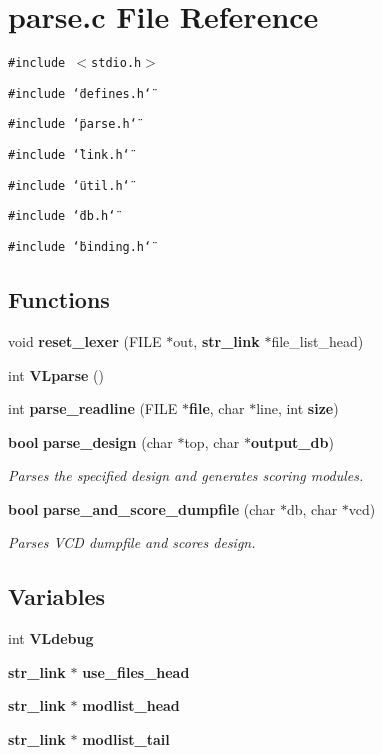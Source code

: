 \section{parse.c File Reference}
\label{parse_8c}
{\tt \#include $<$stdio.h$>$}\par
{\tt \#include \char`\"{}defines.h\char`\"{}}\par
{\tt \#include \char`\"{}parse.h\char`\"{}}\par
{\tt \#include \char`\"{}link.h\char`\"{}}\par
{\tt \#include \char`\"{}util.h\char`\"{}}\par
{\tt \#include \char`\"{}db.h\char`\"{}}\par
{\tt \#include \char`\"{}binding.h\char`\"{}}\par
\subsection*{Functions}
\begin{CompactItemize}
\item 
void {\bf reset\_\-lexer} (FILE $\ast$out, {\bf str\_\-link} $\ast$file\_\-list\_\-head)
\item 
int {\bf VLparse} ()
\item 
int {\bf parse\_\-readline} (FILE $\ast${\bf file}, char $\ast$line, int {\bf size})
\item 
{\bf bool} {\bf parse\_\-design} (char $\ast$top, char $\ast${\bf output\_\-db})
\begin{CompactList}\small\item\em Parses the specified design and generates scoring modules.\item\end{CompactList}\item 
{\bf bool} {\bf parse\_\-and\_\-score\_\-dumpfile} (char $\ast$db, char $\ast$vcd)
\begin{CompactList}\small\item\em Parses VCD dumpfile and scores design.\item\end{CompactList}\end{CompactItemize}
\subsection*{Variables}
\begin{CompactItemize}
\item 
int {\bf VLdebug}
\item 
{\bf str\_\-link} $\ast$ {\bf use\_\-files\_\-head}
\item 
{\bf str\_\-link} $\ast$ {\bf modlist\_\-head}
\item 
{\bf str\_\-link} $\ast$ {\bf modlist\_\-tail}
\end{CompactItemize}


